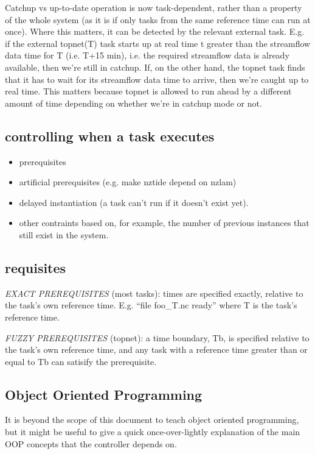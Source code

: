 \documentclass[12pt]{article}
\begin{document}
Catchup vs up-to-date operation is now task-dependent, rather than a
property of the whole system (as it is if only tasks from the same
reference time can run at once).  Where this matters, it can be detected
by the relevant external task. E.g. if the external topnet(T) task
starts up at real time t greater than the streamflow data time for T
(i.e. T+15 min), i.e. the required streamflow data is already available,
then we're still in catchup. If, on the other hand, the topnet task
finds that it has to wait for its streamflow data time to arrive, then
we're caught up to real time.  This matters because topnet is allowed to
run ahead by a different amount of time depending on whether we're in
catchup mode or not.


\subsection{controlling when a task executes}

\begin{itemize}
 \item  prerequisites
 \item artificial prerequisites (e.g. make nztide depend on nzlam)
 \item delayed instantiation (a task can't run if it doesn't exist yet).
 \item other contraints based on, for example, the number of previous instances
       that still exist in the system.
\end{itemize}


\subsection{requisites}

{\em EXACT PREREQUISITES} (most tasks): times are specified exactly,
relative to the task's own reference time.  E.g. ``file foo\_{T}.nc
ready'' where T is the task's reference time.

{\em FUZZY PREREQUISITES} (topnet): a time boundary, Tb, is specified
relative to the task's own reference time, and any task with a reference
time greater than or equal to Tb can satisify the prerequisite.


\subsection{Object Oriented Programming}

It is beyond the scope of this document to teach object oriented
programming, but it might be useful to give a quick once-over-lightly
explanation of the main OOP concepts that the controller depends on.
\end{document}
